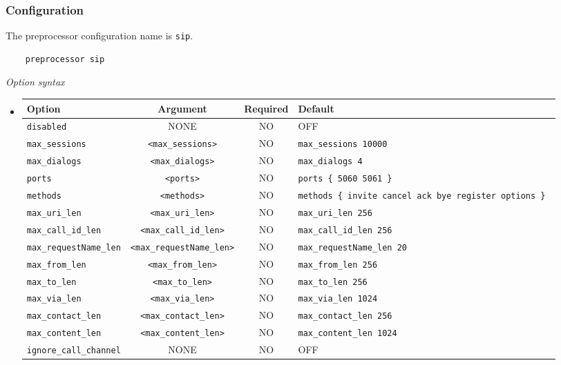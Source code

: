 \documentclass[english]{report}
\begin{document}
\subsubsection{Configuration}
The preprocessor configuration name is \texttt{sip}.\\
\begin{verbatim}
    preprocessor sip
\end{verbatim}
\textit{Option syntax}
\begin{itemize}

\item[]
\begin{tabular}{|l|c|c|p{6cm}|}
\hline
Option & Argument & Required & Default\\
\hline
\hline
\texttt{disabled} & NONE & NO & OFF\\
\hline
\texttt{max\_sessions} & \texttt{<max\_sessions>} & NO & \texttt{max\_sessions 10000}\\
\hline
\texttt{max\_dialogs} & \texttt{<max\_dialogs>} & NO & \texttt{max\_dialogs 4}\\
\hline
\texttt{ports} & \texttt{<ports>} & NO & \texttt{ports \{ 5060 5061 \} }\\
\hline
\texttt{methods} & \texttt{<methods>} & NO & \texttt{methods \{ invite cancel ack bye 
                                                          register options \} }\\
\hline
\texttt{max\_uri\_len} & \texttt{<max\_uri\_len>} & NO & \texttt{max\_uri\_len 256 }\\
\hline
\texttt{max\_call\_id\_len} & \texttt{<max\_call\_id\_len>} & NO & \texttt{max\_call\_id\_len 256 }\\
\hline
\texttt{max\_requestName\_len} & \texttt{<max\_requestName\_len>} & NO & \texttt{max\_requestName\_len 20 }\\
\hline
\texttt{max\_from\_len} & \texttt{<max\_from\_len>} & NO & \texttt{max\_from\_len 256 }\\
\hline
\texttt{max\_to\_len} & \texttt{<max\_to\_len>} & NO & \texttt{max\_to\_len 256 }\\
\hline
\texttt{max\_via\_len} & \texttt{<max\_via\_len>} & NO & \texttt{max\_via\_len 1024 }\\
\hline
\texttt{max\_contact\_len} & \texttt{<max\_contact\_len>} & NO & \texttt{max\_contact\_len 256 }\\
\hline
\texttt{max\_content\_len} & \texttt{<max\_content\_len>} & NO & \texttt{max\_content\_len 1024 }\\
\hline
\texttt{ignore\_call\_channel} & NONE & NO & OFF\\
\hline
\end{tabular}
\end{itemize}
\end{document}
